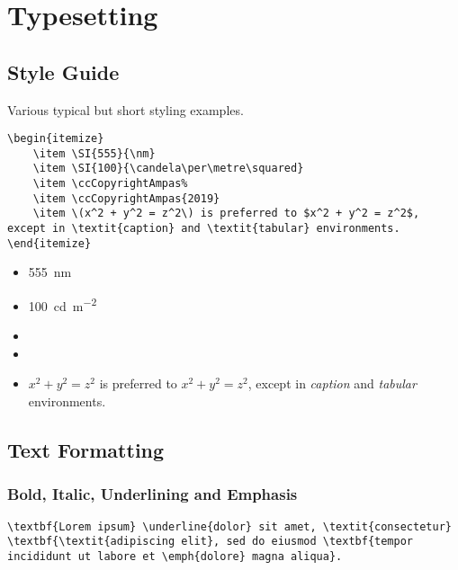 \chapter*{Typesetting}%
\label{ch:typesetting}

\section*{Style Guide}%
\label{sec:style-guide}

Various typical but short styling examples.

\begin{lstlisting}[caption={Various style examples.}]
\begin{itemize}
    \item \SI{555}{\nm}
    \item \SI{100}{\candela\per\metre\squared}
    \item \ccCopyrightAmpas%
    \item \ccCopyrightAmpas{2019}
    \item \(x^2 + y^2 = z^2\) is preferred to $x^2 + y^2 = z^2$, except in \textit{caption} and \textit{tabular} environments.
\end{itemize}
\end{lstlisting}

\begin{itemize}
    \item \SI{555}{\nm}
    \item \SI{100}{\candela\per\metre\squared}
    \item \ccCopyrightAmpas%
    \item {}
    \item \(x^2 + y^2 = z^2\) is preferred to $x^2 + y^2 = z^2$, except in \textit{caption} and \textit{tabular} environments.
\end{itemize}

\section*{Text Formatting}%
\label{sec:text-formatting}

\subsection*{Bold, Italic, Underlining and Emphasis}%
\label{subsec:bold-italic-underlining-and-emphasis}

\begin{lstlisting}[caption={Bold, italic, underlining and emphasis.}]
\textbf{Lorem ipsum} \underline{dolor} sit amet, \textit{consectetur} \textbf{\textit{adipiscing elit}, sed do eiusmod \textbf{tempor incididunt ut labore et \emph{dolore} magna aliqua}.
\end{lstlisting}

